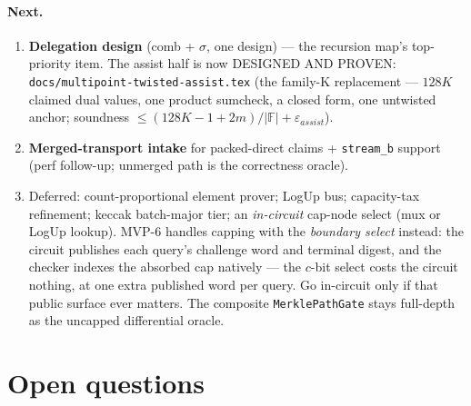 \documentclass[11pt]{article}
\newcommand{\code}[1]{\texttt{#1}}
\theoremstyle{definition}
\begin{document}
\paragraph{Next.}
\begin{enumerate}[nosep]
  \item \textbf{Delegation design} (comb + $\sigma$, one design) --- the
        recursion map's top-priority item. The assist half is now
        DESIGNED AND PROVEN: \texttt{docs/multipoint-twisted-assist.tex}
        (the family-K replacement --- $128K$ claimed dual values, one
        product sumcheck, a closed form, one untwisted anchor; soundness
        $\le (128K{-}1{+}2m)/|\mathbb{F}| + \varepsilon_{assist}$).
  \item \textbf{Merged-transport intake} for packed-direct claims +
        \code{stream\_b} support (perf follow-up; unmerged path is the
        correctness oracle).
  \item Deferred: count-proportional element prover; LogUp bus;
        capacity-tax refinement; keccak batch-major tier; an
        \emph{in-circuit} cap-node select (mux or LogUp lookup). MVP-6
        handles capping with the \emph{boundary select} instead: the
        circuit publishes each query's challenge word and terminal
        digest, and the checker indexes the absorbed cap natively ---
        the $c$-bit select costs the circuit nothing, at one extra
        published word per query. Go in-circuit only if that public
        surface ever matters. The composite \code{MerklePathGate}
        stays full-depth as the uncapped differential oracle.
\end{enumerate}

\section{Open questions}\label{sec:open}
\end{document}
